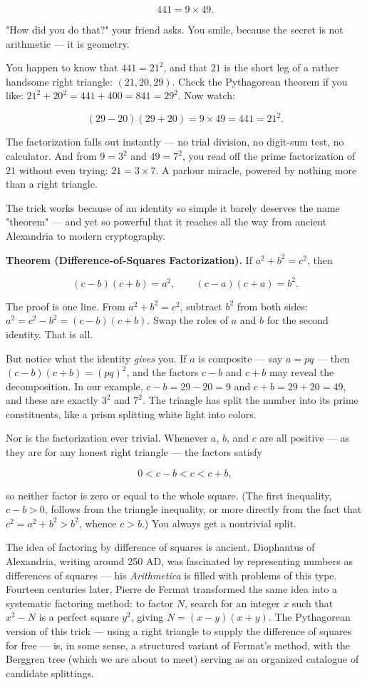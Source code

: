 \documentclass[11pt,twoside,openright]{book}
\theoremstyle{definition}
\theoremstyle{remark}
\begin{document}
\[441 = 9 \times 49.\]

"How did you do that?" your friend asks. You smile, because the secret is not arithmetic --- it is geometry.

You happen to know that $441 = 21^2$, and that $21$ is the short leg of a rather handsome right triangle: $(21, 20, 29)$. Check the Pythagorean theorem if you like: $21^2 + 20^2 = 441 + 400 = 841 = 29^2$. Now watch:

\[(29 - 20)(29 + 20) = 9 \times 49 = 441 = 21^2.\]

The factorization falls out instantly --- no trial division, no digit-sum test, no calculator. And from $9 = 3^2$ and $49 = 7^2$, you read off the prime factorization of $21$ without even trying: $21 = 3 \times 7$. A parlour miracle, powered by nothing more than a right triangle.


The trick works because of an identity so simple it barely deserves the name "theorem" --- and yet so powerful that it reaches all the way from ancient Alexandria to modern cryptography.

\textbf{Theorem (Difference-of-Squares Factorization).} If $a^2 + b^2 = c^2$, then

\[(c - b)(c + b) = a^2, \qquad (c - a)(c + a) = b^2.\]

The proof is one line. From $a^2 + b^2 = c^2$, subtract $b^2$ from both sides: $a^2 = c^2 - b^2 = (c-b)(c+b)$. Swap the roles of $a$ and $b$ for the second identity. That is all.

But notice what the identity \textit{gives} you. If $a$ is composite --- say $a = pq$ --- then $(c-b)(c+b) = (pq)^2$, and the factors $c - b$ and $c + b$ may reveal the decomposition. In our example, $c - b = 29 - 20 = 9$ and $c + b = 29 + 20 = 49$, and these are exactly $3^2$ and $7^2$. The triangle has split the number into its prime constituents, like a prism splitting white light into colors.

Nor is the factorization ever trivial. Whenever $a$, $b$, and $c$ are all positive --- as they are for any honest right triangle --- the factors satisfy

\[0 < c - b < c < c + b,\]

so neither factor is zero or equal to the whole square. (The first inequality, $c - b > 0$, follows from the triangle inequality, or more directly from the fact that $c^2 = a^2 + b^2 > b^2$, whence $c > b$.) You always get a nontrivial split.


The idea of factoring by difference of squares is ancient. Diophantus of Alexandria, writing around 250 AD, was fascinated by representing numbers as differences of squares --- his \textit{Arithmetica} is filled with problems of this type. Fourteen centuries later, Pierre de Fermat transformed the same idea into a systematic factoring method: to factor $N$, search for an integer $x$ such that $x^2 - N$ is a perfect square $y^2$, giving $N = (x - y)(x + y)$. The Pythagorean version of this trick --- using a right triangle to supply the difference of squares for free --- is, in some sense, a structured variant of Fermat's method, with the Berggren tree (which we are about to meet) serving as an organized catalogue of candidate splittings.
\end{document}
